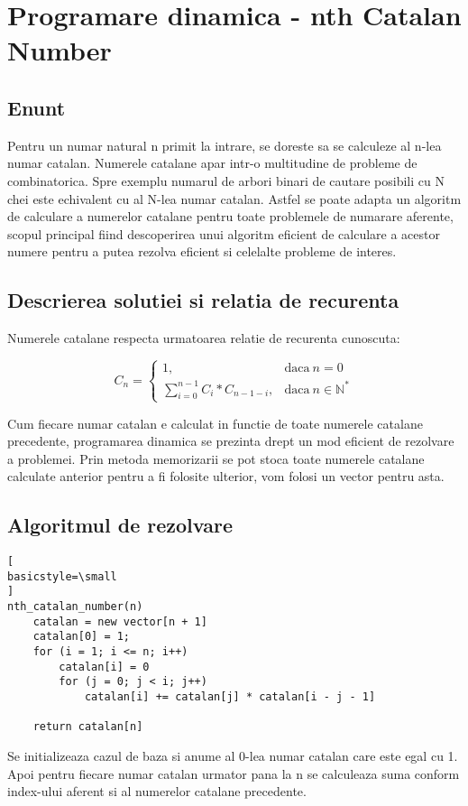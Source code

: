 \documentclass[runningheads]{llncs}
\begin{document}
\section{Programare dinamica - nth Catalan Number}
\subsection{Enunt}
Pentru un numar natural n primit la intrare, se doreste sa se calculeze al n-lea numar catalan. Numerele catalane apar intr-o multitudine de
probleme de combinatorica. Spre exemplu numarul de arbori binari de cautare posibili cu N chei este echivalent cu al N-lea numar catalan.
Astfel se poate adapta un algoritm de calculare a numerelor catalane pentru toate problemele de numarare aferente, scopul principal
fiind descoperirea unui algoritm eficient de calculare a acestor numere pentru a putea rezolva eficient si celelalte probleme de
interes.
\subsection{Descrierea solutiei si relatia de recurenta}
Numerele catalane respecta urmatoarea relatie de recurenta cunoscuta:

\begin{equation}
C_{n}=
\begin{cases}
1, & \text{daca}\ n=0 \\
\sum_{i=0}^{n-1} C_{i}*C_{n-1-i}, & \text{daca}\ n \in \mathbb{N}^*
\end{cases}
\end{equation}

Cum fiecare numar catalan e calculat in functie de toate numerele catalane precedente, programarea dinamica se prezinta drept un mod
eficient de rezolvare a problemei. Prin metoda memorizarii se pot stoca toate numerele catalane calculate anterior pentru a fi folosite
ulterior, vom folosi un vector pentru asta.
\subsection{Algoritmul de rezolvare}
\begin{lstlisting}[
basicstyle=\small
]
nth_catalan_number(n)
	catalan = new vector[n + 1]
	catalan[0] = 1;
	for (i = 1; i <= n; i++)
		catalan[i] = 0
		for (j = 0; j < i; j++)
			catalan[i] += catalan[j] * catalan[i - j - 1]

	return catalan[n]
\end{lstlisting}
\vspace*{1em}
Se initializeaza cazul de baza si anume al 0-lea numar catalan care este egal cu 1. Apoi pentru fiecare numar catalan urmator pana la n
se calculeaza suma conform index-ului aferent si al numerelor catalane precedente.
\\
\end{document}
